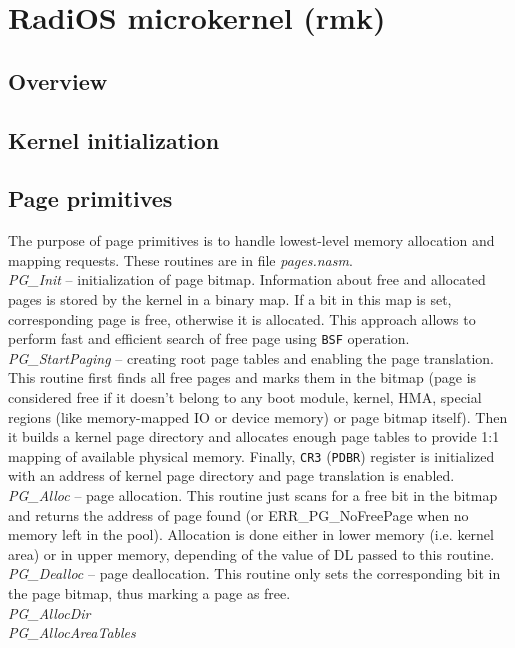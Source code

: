 
\section{RadiOS microkernel (rmk)}

\subsection{Overview}

\subsection{Kernel initialization}

\subsection{Page primitives}

The purpose of page primitives is to handle lowest-level memory allocation
and mapping requests. These routines are in file \textit{pages.nasm}.
\\
\textit{PG\_Init} -- initialization of page bitmap. Information about free
and allocated pages is stored by the kernel in a binary map. If a bit in
this map is set, corresponding page is free, otherwise it is allocated.
This approach allows to perform fast and efficient search of free page using
\texttt{BSF} operation.
\\
\textit{PG\_StartPaging} -- creating root page tables and enabling the page
translation. This routine first finds all free pages and marks them in the
bitmap (page is considered free if it doesn't belong to any boot module,
kernel, HMA, special regions (like memory-mapped IO or device memory) or
page bitmap itself). Then it builds a kernel page directory and allocates
enough page tables to provide 1:1 mapping of available physical memory.
Finally, \texttt{CR3} (\texttt{PDBR}) register is initialized with an address
of kernel page directory and page translation is enabled.
\\
\textit{PG\_Alloc} -- page allocation. This routine just scans for a free
bit in the bitmap and returns the address of page found (or ERR\_PG\_NoFreePage
when no memory left in the pool). Allocation is done either in lower memory
(i.e. kernel area) or in upper memory, depending of the value of DL passed
to this routine.
\\
\textit{PG\_Dealloc} -- page deallocation. This routine only sets the
corresponding bit in the page bitmap, thus marking a page as free.
\\
\textit{PG\_AllocDir}
\\
\textit{PG\_AllocAreaTables}
\\

